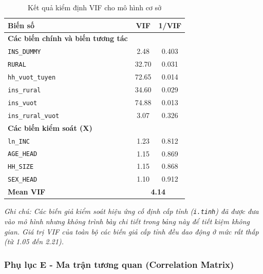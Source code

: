 \documentclass[12pt,a4paper]{article}
\begin{document}
\begin{table}[htbp]
	\centering
	\caption{Kết quả kiểm định VIF cho mô hình cơ sở}
	\label{tab:vif_test}
	\begin{tabular}{lcc}
		\toprule
		\textbf{Biến số} & \textbf{VIF} & \textbf{1/VIF} \\
		\midrule
		\textbf{Các biến chính và biến tương tác} & & \\
		\texttt{INS\_DUMMY} & 2.48 & 0.403 \\
		\texttt{RURAL} & 32.70 & 0.031 \\
		\texttt{hh\_vuot\_tuyen} & 72.65 & 0.014 \\
		\texttt{ins\_rural} & 34.60 & 0.029 \\
		\texttt{ins\_vuot} & 74.88 & 0.013 \\
		\texttt{ins\_rural\_vuot} & 3.07 & 0.326 \\
		\midrule
		\textbf{Các biến kiểm soát (X)} & & \\
		\texttt{ln\_INC} & 1.23 & 0.812 \\
		\texttt{AGE\_HEAD} & 1.15 & 0.869 \\
		\texttt{HH\_SIZE} & 1.15 & 0.868 \\
		\texttt{SEX\_HEAD} & 1.10 & 0.912 \\
		\midrule
		\textbf{Mean VIF} & \multicolumn{2}{c}{\textbf{4.14}} \\
		\bottomrule
	\end{tabular}
	
	\vspace{1ex}
	\raggedright \textit{\small Ghi chú: Các biến giả kiểm soát hiệu ứng cố định cấp tỉnh (\texttt{i.tinh}) đã được đưa vào mô hình nhưng không trình bày chi tiết trong bảng này để tiết kiệm không gian. Giá trị VIF của toàn bộ các biến giả cấp tỉnh đều dao động ở mức rất thấp (từ 1.05 đến 2.21).}
\end{table}

\newpage
\subsubsection{Phụ lục E - Ma trận tương quan (Correlation Matrix)}
\end{document}
